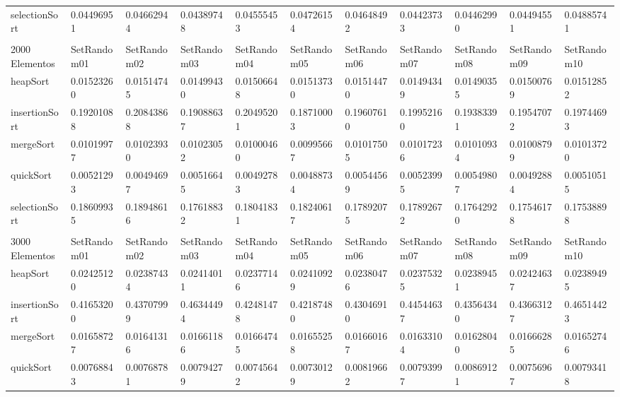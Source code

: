 \documentclass[article,a4paper]{article}
\begin{document}
\begin{table}[h]
{\begin{tabular}{lllllllllll}
selectionSort   & 0.04496951  & 0.04662944  & 0.04389748  & 0.04555453  & 0.04726154  & 0.04648492  & 0.04423733  & 0.04462990  & 0.04494551  & 0.04885741  \\
                &             &             &             &             &             &             &             &             &             &             \\
2000 Elementos  & SetRandom01 & SetRandom02 & SetRandom03 & SetRandom04 & SetRandom05 & SetRandom06 & SetRandom07 & SetRandom08 & SetRandom09 & SetRandom10 \\
heapSort        & 0.01523260  & 0.01514745  & 0.01499430  & 0.01506648  & 0.01513730  & 0.01514470  & 0.01494349  & 0.01490355  & 0.01500769  & 0.01512852  \\
insertionSort   & 0.19201088  & 0.20843868  & 0.19088637  & 0.20495201  & 0.18710003  & 0.19607610  & 0.19952160  & 0.19383391  & 0.19547072  & 0.19744693  \\
mergeSort       & 0.01019977  & 0.01023930  & 0.01023052  & 0.01000460  & 0.00995667  & 0.01017505  & 0.01017236  & 0.01010934  & 0.01008799  & 0.01013720  \\
quickSort       & 0.00521293  & 0.00494697  & 0.00516645  & 0.00492783  & 0.00488734  & 0.00544569  & 0.00523995  & 0.00549807  & 0.00492884  & 0.00510515  \\
selectionSort   & 0.18609935  & 0.18948616  & 0.17618832  & 0.18041831  & 0.18240617  & 0.17892075  & 0.17892672  & 0.17642920  & 0.17546178  & 0.17538898  \\
                &             &             &             &             &             &             &             &             &             &             \\
3000 Elementos  & SetRandom01 & SetRandom02 & SetRandom03 & SetRandom04 & SetRandom05 & SetRandom06 & SetRandom07 & SetRandom08 & SetRandom09 & SetRandom10 \\
heapSort        & 0.02425120  & 0.02387434  & 0.02414011  & 0.02377146  & 0.02410929  & 0.02380476  & 0.02375325  & 0.02389451  & 0.02424637  & 0.02389495  \\
insertionSort   & 0.41653200  & 0.43707999  & 0.46344494  & 0.42481478  & 0.42187480  & 0.43046910  & 0.44544637  & 0.43564340  & 0.43663127  & 0.46514423  \\
mergeSort       & 0.01658727  & 0.01641316  & 0.01661186  & 0.01664745  & 0.01655258  & 0.01660167  & 0.01633104  & 0.01628040  & 0.01666285  & 0.01652746  \\
quickSort       & 0.00768843  & 0.00768781  & 0.00794279  & 0.00745642  & 0.00730129  & 0.00819662  & 0.00793997  & 0.00869121  & 0.00756967  & 0.00793418  \\

\end{tabular}}
\end{table}
\end{document}
